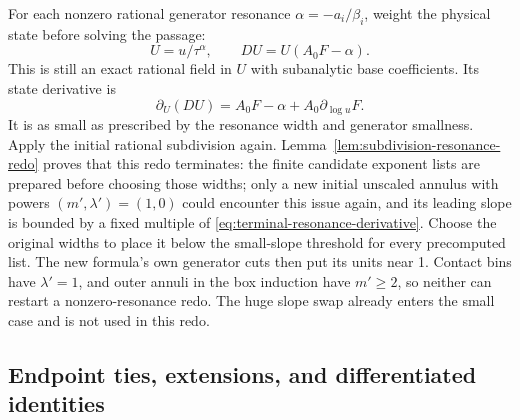 For each nonzero rational generator resonance
\(\alpha=-a_i/\beta_i\), weight the physical state before solving the
passage:
\begin{equation}\label{eq:terminal-resonance-weight}
 U=u/\tau^\alpha,\qquad DU=U(A_0F-\alpha).
\end{equation}
This is still an exact rational field in \(U\) with subanalytic base
coefficients.  Its state derivative is
\begin{equation}\label{eq:terminal-resonance-derivative}
 \partial_U(DU)=A_0F-\alpha+A_0\partial_{\log u}F.
\end{equation}
It is as small as prescribed by the resonance width and generator
smallness.  Apply the initial rational subdivision again.
Lemma~\ref{lem:subdivision-resonance-redo} proves that this redo terminates:
the finite candidate exponent lists are prepared before choosing those
widths; only a new initial unscaled annulus with powers \((m',\lambda')
=(1,0)\) could encounter this issue again, and its leading slope is
bounded by a fixed multiple of
\eqref{eq:terminal-resonance-derivative}.  Choose the original widths to
place it below the small-slope threshold for every precomputed list.
The new formula's own generator cuts then put its units near 1.  Contact
bins have \(\lambda'=1\), and outer annuli in the box induction have
\(m'\ge2\), so neither can restart a nonzero-resonance redo.  The huge
slope swap already enters the small case and is not used in this redo.

\subsection{Endpoint ties, extensions, and differentiated identities}

